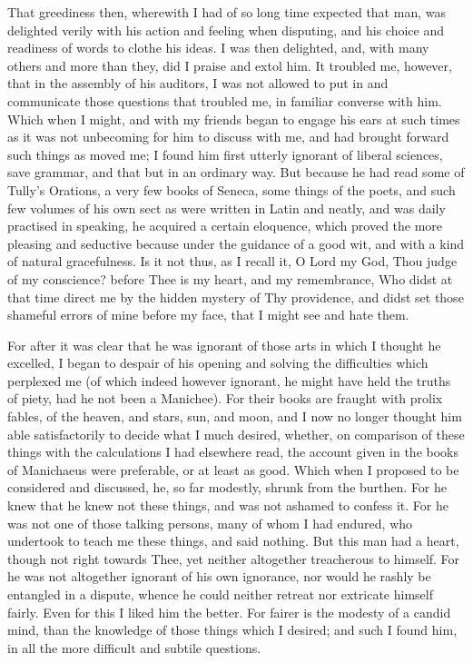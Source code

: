 \documentclass[b5paper,openright,12pt,twoside]{book}
\begin{document}
That greediness then, wherewith I had of so long time expected that man,
was delighted verily with his action and feeling when disputing, and his
choice and readiness of words to clothe his ideas. I was then delighted,
and, with many others and more than they, did I praise and extol him.
It troubled me, however, that in the assembly of his auditors, I was not
allowed to put in and communicate those questions that troubled me,
in familiar converse with him. Which when I might, and with my friends
began to engage his ears at such times as it was not unbecoming for him
to discuss with me, and had brought forward such things as moved me; I
found him first utterly ignorant of liberal sciences, save grammar, and
that but in an ordinary way. But because he had read some of Tully's
Orations, a very few books of Seneca, some things of the poets, and such
few volumes of his own sect as were written in Latin and neatly, and
was daily practised in speaking, he acquired a certain eloquence, which
proved the more pleasing and seductive because under the guidance of a
good wit, and with a kind of natural gracefulness. Is it not thus, as I
recall it, O Lord my God, Thou judge of my conscience? before Thee is
my heart, and my remembrance, Who didst at that time direct me by the
hidden mystery of Thy providence, and didst set those shameful errors of
mine before my face, that I might see and hate them.

For after it was clear that he was ignorant of those arts in which I
thought he excelled, I began to despair of his opening and solving the
difficulties which perplexed me (of which indeed however ignorant, he
might have held the truths of piety, had he not been a Manichee). For
their books are fraught with prolix fables, of the heaven, and stars,
sun, and moon, and I now no longer thought him able satisfactorily to
decide what I much desired, whether, on comparison of these things with
the calculations I had elsewhere read, the account given in the books of
Manichaeus were preferable, or at least as good. Which when I proposed
to be considered and discussed, he, so far modestly, shrunk from the
burthen. For he knew that he knew not these things, and was not ashamed
to confess it. For he was not one of those talking persons, many of whom
I had endured, who undertook to teach me these things, and said nothing.
But this man had a heart, though not right towards Thee, yet neither
altogether treacherous to himself. For he was not altogether ignorant of
his own ignorance, nor would he rashly be entangled in a dispute, whence
he could neither retreat nor extricate himself fairly. Even for this I
liked him the better. For fairer is the modesty of a candid mind, than
the knowledge of those things which I desired; and such I found him, in
all the more difficult and subtile questions.
\end{document}
